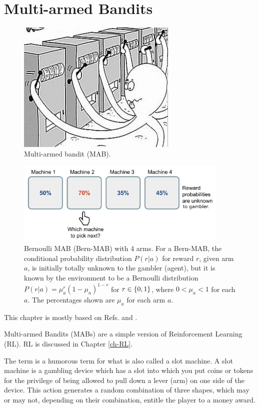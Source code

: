 \chapter{Multi-armed Bandits}\label{ch-multi-armed}


\begin{figure}[h!]
\centering
\includegraphics[width=3in]
{multi-armed/octupus-bandit.png}
\caption{Multi-armed bandit (MAB).
} 
\label{fig-octupus-bandit}
\end{figure}

\begin{figure}[h!]
\centering
\includegraphics[width=4in]
{multi-armed/bern_bandit.png}
\caption{Bernoulli MAB (Bern-MAB)
with 4 arms. For a Bern-MAB, the 
conditional probability 
distribution $P(r|a)$ for reward $r$,
given  
arm $a$,
is initially totally unknown to the gambler (agent), 
but it is known by the environment to be
a Bernoulli distribution $P(r|a) = \mu_a^r(1-\mu_a)^{1-r}$
for $r\in \{0,1\}$, where $0<\mu_a<1$ for each $a$.
The percentages shown are $\mu_a$ for each arm $a$. }
\label{fig-bern-bandit}
\end{figure}

This chapter
is mostly based on Refs.
\cite{book-ashwin-rao} and \cite{weng2018bandit}.

Multi-armed Bandits (MABs) are a simple
version  of 
Reinforcement Learning (RL). RL is discussed 
in Chapter \ref{ch-RL}.

The term 
is a humorous term 
for what is also called
a slot machine.
A slot machine is a gambling device
which has a slot into which
you put coins or tokens
for the privilege of being allowed to  pull down 
a lever (arm) on one side of the device.
This action generates 
a random combination of three shapes, 
which may or may not, depending on their combination,
entitle the player to a 
 money award.

